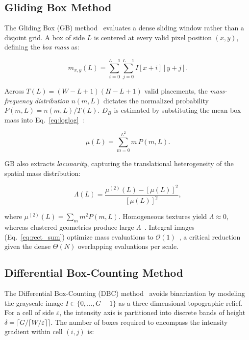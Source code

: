 \subsection{Gliding Box Method}
\label{sec:theory:gb}

The Gliding Box (GB) method~\cite{Allain1991} evaluates a dense sliding window rather than a disjoint grid. A box of side $L$ is centered at every valid pixel position $(x, y)$, defining the \textit{box mass} as:

\begin{equation}
  m_{x,y}(L) = \sum_{i=0}^{L-1} \sum_{j=0}^{L-1} I[x+i][y+j].
  \label{eq:gb_mass}
\end{equation}

\noindent Across $T(L) = (W-L+1)(H-L+1)$ valid placements, the \textit{mass-frequency distribution} $n(m, L)$ dictates the normalized probability $P(m, L) = n(m, L) / T(L)$. $D_B$ is estimated by substituting the mean box mass into Eq.~\eqref{eq:loglog}~\cite{Plotnick1996}:

\begin{equation}
  \mu(L) = \sum_{m=0}^{L^{2}} m \, P(m, L).
  \label{eq:gb_mu1}
\end{equation}

GB also extracts \textit{lacunarity}, capturing the translational heterogeneity of the spatial mass distribution:

\begin{equation}
  \Lambda(L)
    = \frac{\mu^{(2)}(L) - [\mu(L)]^{2}}{[\mu(L)]^{2}},
  \label{eq:lacunarity}
\end{equation}

\noindent where $\mu^{(2)}(L) = \sum_{m} m^{2} P(m, L)$. Homogeneous textures yield $\Lambda \approx 0$, whereas clustered geometries produce large $\Lambda$~\cite{Allain1991,Tolle2008}. Integral images (Eq.~\eqref{eq:rect_sum}) optimize mass evaluations to $\mathcal{O}(1)$~\cite{Crow1984}, a critical reduction given the dense $\Theta(N)$ overlapping evaluations per scale.

\subsection{Differential Box-Counting Method}
\label{sec:theory:dbc}

The Differential Box-Counting (DBC) method~\cite{Sarkar1994} avoids binarization by modeling the grayscale image $I \in \{0, \ldots, G{-}1\}$ as a three-dimensional topographic relief. For a cell of side $\varepsilon$, the intensity axis is partitioned into discrete bands of height $\delta = \lceil G / \lceil W/\varepsilon \rceil \rceil$. The number of boxes required to encompass the intensity gradient within cell $(i, j)$ is:


